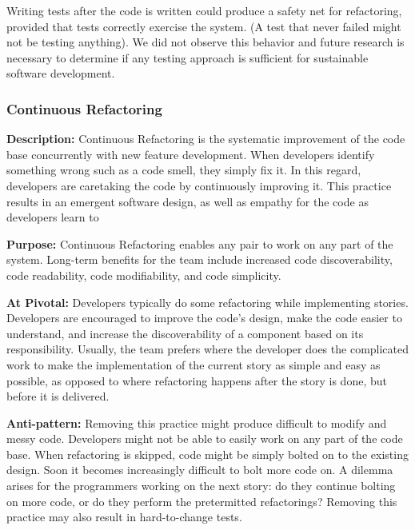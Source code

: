 Writing tests after the code is written could produce a safety net for refactoring, provided that tests correctly exercise the system. (A test that never failed might not be testing anything). We did not observe this behavior and future research is necessary to determine if any testing approach is sufficient for sustainable software development.

\subsubsection{Continuous Refactoring}
\textbf{Description:} Continuous Refactoring is the systematic improvement of the code base concurrently with new feature development. When developers identify something wrong such as a code smell, they simply fix it. In this regard, developers are caretaking the code by continuously improving it. This practice results in an emergent software design, as well as empathy for the code as developers learn to  


\textbf{Purpose:} Continuous Refactoring enables any pair to work on any part of the system. Long-term benefits for the team include increased code discoverability, code readability, code modifiability, and code simplicity. 

\textbf{At Pivotal:} Developers typically do some refactoring while implementing stories. Developers are encouraged to improve the code’s design, make the code easier to understand, and increase the discoverability of a component based on its responsibility. Usually, the team prefers  where the developer does the complicated work to make the implementation of the current story as simple and easy as possible, as opposed to  where refactoring happens after the story is done, but before it is delivered. 

\textbf{Anti-pattern:} Removing this practice might produce difficult to modify and messy code. Developers might not be able to easily work on any part of the code base. When refactoring is skipped, code might be simply bolted on to the existing design. Soon it becomes increasingly difficult to bolt more code on. A dilemma arises for the programmers working on the next story: do they continue bolting on more code, or do they perform the pretermitted refactorings? Removing this practice may also result in hard-to-change tests.

